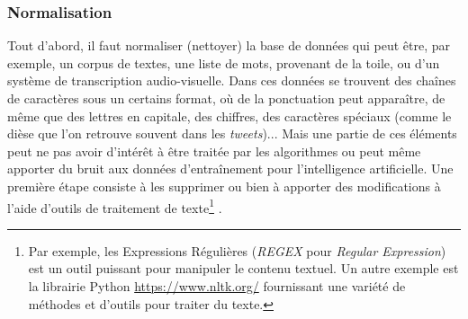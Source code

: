 \documentclass[12pt, twoside]{report}
\begin{document}
\subsubsection{Normalisation}
Tout d'abord, il faut normaliser (nettoyer) la base de données qui peut être, par exemple, un corpus de textes, une liste de mots, provenant de la toile, ou d'un système de transcription audio-visuelle. Dans ces données se trouvent des chaînes de caractères sous un certains format, où de la ponctuation peut apparaître, de même que des lettres en capitale, des chiffres, des caractères spéciaux (comme le dièse que l'on retrouve souvent dans les \textit{tweets})... Mais une partie de ces éléments peut ne pas avoir d'intérêt à être traitée par les algorithmes ou peut même apporter du bruit aux données d'entraînement pour l'intelligence artificielle. Une première étape consiste à les supprimer ou bien à apporter des modifications à l'aide d'outils de traitement de texte\footnote{Par exemple, les Expressions Régulières (\textit{REGEX} pour \textit{Regular Expression}) est un outil puissant pour manipuler le contenu textuel. Un autre exemple est la librairie Python \url{https://www.nltk.org/} fournissant une variété de méthodes et d'outils pour traiter du texte.} \autocite[chap.~2]{jurafsky}.\\
\end{document}
